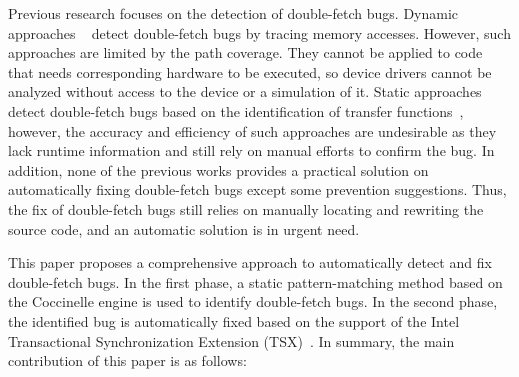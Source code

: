 \documentclass[10pt]{llncs}
\begin{document}
Previous research focuses on the detection of double-fetch bugs. Dynamic approaches
~\cite{bochspwn,jurczyk2013identifying,wilhelm15tracing} detect double-fetch bugs by tracing 
memory accesses. However, such approaches are limited by the path coverage. They cannot be 
applied to code that needs corresponding hardware to be executed, so device drivers cannot be 
analyzed without access to the device or a simulation of it. Static approaches detect double-fetch 
bugs based on the identification of transfer functions~\cite{wang, precise}, however, the accuracy 
and efficiency of such approaches are undesirable as they lack runtime information and still 
rely on manual efforts to confirm the bug. 
In addition, none of the previous works provides a practical solution on automatically fixing 
double-fetch bugs except some prevention suggestions. Thus, the fix of double-fetch bugs still relies
on manually locating and rewriting the source code, and an automatic solution is in urgent need.




This paper proposes a comprehensive approach to automatically detect and fix double-fetch bugs. In the first phase, 
a static pattern-matching method based on the Coccinelle engine is used to identify double-fetch bugs.
In the second phase, the identified bug is automatically fixed based on the support of the Intel 
Transactional Synchronization Extension (TSX)~\cite{Yoo2014Performance}.%
In summary, the main contribution of this paper is as follows:
\end{document}

